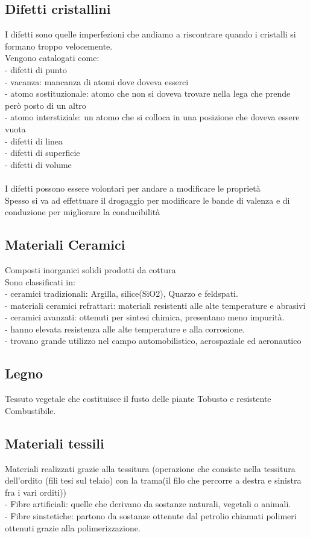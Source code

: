 \subsection{Difetti cristallini}
I difetti sono quelle imperfezioni che andiamo a riscontrare quando i cristalli si formano troppo velocemente.\\
Vengono catalogati come:\\
\tab- difetti di punto\\
\tab\tab- vacanza: mancanza di atomi dove doveva esserci\\
\tab\tab- atomo sostituzionale: atomo che non si doveva trovare nella lega che prende però posto di un altro\\
\tab\tab- atomo interstiziale: un atomo che si colloca in una posizione che doveva essere vuota\\
\tab- difetti di linea\\
\tab- difetti di superficie\\
\tab- difetti di volume\\\\
I difetti possono essere volontari per andare a modificare le proprietà\\
Spesso si va ad effettuare il drogaggio per modificare le bande di valenza e di conduzione per migliorare la conducibilità\\
\subsection{Materiali Ceramici}
Composti inorganici solidi prodotti da cottura\\
Sono classificati in:\\
\tab- ceramici tradizionali: Argilla, silice(SiO2), Quarzo e feldspati. \\
\tab\tab- materiali ceramici refrattari: materiali resistenti alle alte temperature e abrasivi\\
\tab- ceramici avanzati: ottenuti per sintesi chimica, presentano meno impurità.\\
\tab\tab- hanno elevata resistenza alle alte temperature e alla corrosione. \\
\tab\tab- trovano grande utilizzo nel campo automobilistico, aerospaziale ed aeronautico
\subsection{Legno}
Tessuto vegetale che costituisce il fusto delle piante
Tobusto e resistente
Combustibile. 
\subsection{Materiali tessili}
Materiali realizzati grazie alla tessitura (operazione che consiste nella tessitura dell'ordito (fili tesi sul telaio) con la trama(il filo che percorre a destra e sinistra fra i vari orditi))\\
\tab- Fibre artificiali: quelle che derivano da sostanze naturali, vegetali o animali. \\
\tab- Fibre sinstetiche: partono da sostanze ottenute dal petrolio chiamati polimeri ottenuti grazie alla polimerizzazione. \\
